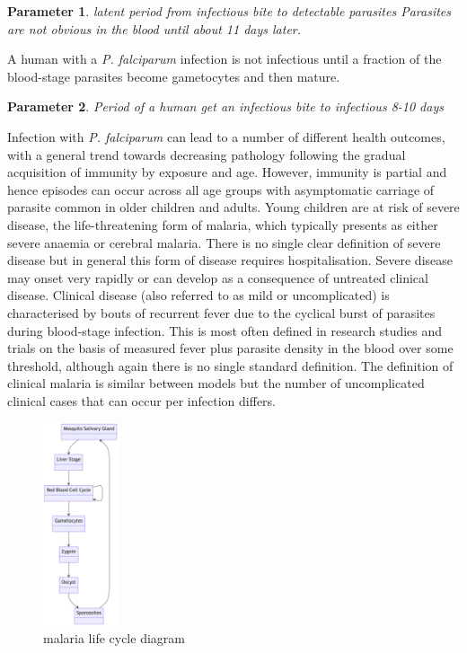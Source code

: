 \documentclass[a4paper, 12pt, twoside]{article}
\newtheorem{parameter}{Parameter}
\begin{document}
\begin{parameter}
	{latent period from infectious bite to detectable parasites}
	Parasites are not obvious in the blood until about 11 days later.
\end{parameter}

A human with a \textit{P. falciparum} infection is not infectious until a fraction of the blood-stage parasites become gametocytes and then mature.

\begin{parameter}
	{Period of a human get an infectious bite to infectious}
	{8-10 days}
\end{parameter}

Infection with \textit{P. falciparum} can lead to a number of different health outcomes, with a general trend towards decreasing pathology following the gradual acquisition of immunity by exposure and age.
However, immunity is partial and hence episodes can occur across all age groups with asymptomatic carriage of parasite common in older children and adults.
Young children are at risk of severe disease, the life-threatening form of malaria, which typically presents as either severe anaemia or cerebral malaria.
There is no single clear definition of severe disease but in general this form of disease requires hospitalisation.
Severe disease may onset very rapidly or can develop as a consequence of untreated clinical disease.
Clinical disease (also referred to as mild or uncomplicated) is characterised by bouts of recurrent fever due to the cyclical burst of parasites during blood-stage infection.
This is most often defined in research studies and trials on the basis of measured fever plus parasite density in the blood over some threshold, although again there is no single standard definition.
The definition of clinical malaria is similar between models but the number of uncomplicated clinical cases that can occur per infection differs.

\begin{figure}[htpb]
	\centering
	\includegraphics[width=0.2\textwidth]{malaria-life-cycle-diagram}
	\caption{malaria life cycle diagram}
	\label{fig:malaria-life-cycle-diagram}
\end{figure}
\end{document}
